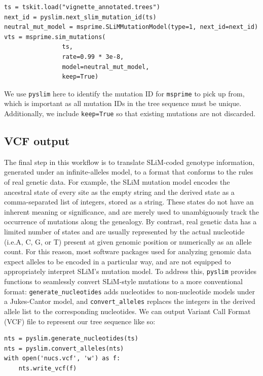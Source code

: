\documentclass[12pt]{article}
\newcommand{\msprime}[0]{\texttt{msprime}\xspace}
\newcommand{\pyslim}[0]{\texttt{pyslim}\xspace}
\newcommand*{\ie}{i.e.\xcomma}
\begin{document}
\begin{verbatim}
ts = tskit.load("vignette_annotated.trees")
next_id = pyslim.next_slim_mutation_id(ts)
neutral_mut_model = msprime.SLiMMutationModel(type=1, next_id=next_id)
vts = msprime.sim_mutations(
                ts,
                rate=0.99 * 3e-8,
                model=neutral_mut_model,
                keep=True)
\end{verbatim}

We use \pyslim here to identify the mutation ID for \msprime to pick up from, which is important as all mutation IDs in the tree sequence must be unique.
Additionally, we include \verb|keep=True| so that existing mutations are not discarded.

\subsection*{VCF output}

The final step in this workflow is to translate SLiM-coded genotype information, generated under an infinite-alleles model, to a format that conforms to
the rules of real genetic data. For example, the SLiM mutation model encodes the ancestral state of every site as the empty string and the derived state
as a comma-separated list of integers, stored as a string. These states do not have an inherent meaning or significance, and are merely used to unambiguously
track the occurrence of mutations along the genealogy. By contrast, real genetic data has a limited number of states and are usually represented
by the actual nucleotide (\ie A, C, G, or T) present at given genomic position or numerically as an allele count. For this reason, most software packages used
for analyzing genomic data expect alleles to be encoded in a particular way, and are not equipped to appropriately interpret SLiM's mutation model.
To address this, \pyslim provides functions to seamlessly convert SLiM-style mutations to a more conventional format: \verb|generate_nucleotides| adds
nucleotides to non-nucleotide models under a Jukes-Cantor model, and \verb|convert_alleles| replaces the integers in the derived allele list to the corresponding
nucleotides. We can output Variant Call Format (VCF) file to represent our tree sequence like so:

\begin{verbatim}
nts = pyslim.generate_nucleotides(ts)
nts = pyslim.convert_alleles(nts)
with open('nucs.vcf', 'w') as f:
    nts.write_vcf(f)
\end{verbatim}
\end{document}
